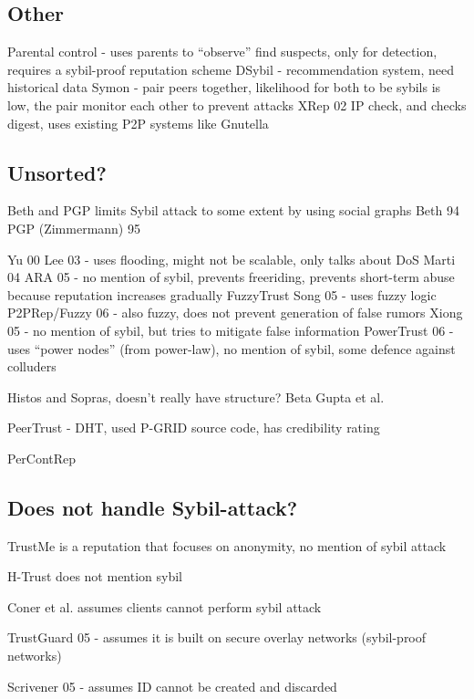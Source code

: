 \subsection{Other}
Parental control\cite{tehale2012parental} - uses parents to ``observe'' find suspects, only for detection, requires a sybil-proof reputation scheme
DSybil\cite{yu2009dsybil} - recommendation system, need historical data
Symon\cite{jyothi2009symon} - pair peers together, likelihood for both to be sybils is low, the pair monitor each other to prevent attacks
XRep 02\cite{damiani2002reputation} IP check, and checks digest, uses existing P2P systems like Gnutella

\subsection{Unsorted?}

Beth and PGP limits Sybil attack to some extent by using social graphs
Beth 94\cite{beth1994valuation}
PGP (Zimmermann) 95\cite{zimmermann1995official}

Yu 00\cite{yu2000social}
Lee 03\cite{lee2003cooperative} - uses flooding, might not be scalable, only talks about DoS
Marti 04\cite{marti2004limited}
ARA 05\cite{ham2005ara} - no mention of sybil, prevents freeriding, prevents short-term abuse because reputation increases gradually
FuzzyTrust Song 05\cite{song2005trusted} - uses fuzzy logic
P2PRep/Fuzzy 06\cite{aringhieri2006fuzzy} - also fuzzy, does not prevent generation of false rumors
Xiong 05\cite{xiong2007countering} - no mention of sybil, but tries to mitigate false information
PowerTrust 06\cite{zhou2007powertrust} - uses ``power nodes'' (from power-law), no mention of sybil, some defence against colluders

Histos and Sopras\cite{zacharia2000collaborative}, doesn't really have structure?
Beta\cite{jsang2002beta}
Gupta et al.\cite{gupta2003reputation}

PeerTrust\cite{xiong2004peertrust} - DHT, used P-GRID source code, has credibility rating

PerContRep\cite{yan2014percontrep}


\subsection{Does not handle Sybil-attack?}
TrustMe\cite{singh2003trustme} is a reputation that focuses on anonymity, no mention of sybil attack

H-Trust\cite{zhao2009htrust} does not mention sybil

Coner et al.\cite{conner2009trust} assumes clients cannot perform sybil attack

TrustGuard 05\cite{srivatsa2005trustguard} - assumes it is built on secure overlay networks (sybil-proof networks)

Scrivener 05\cite{nandi2005scrivener} - assumes ID cannot be created and discarded


